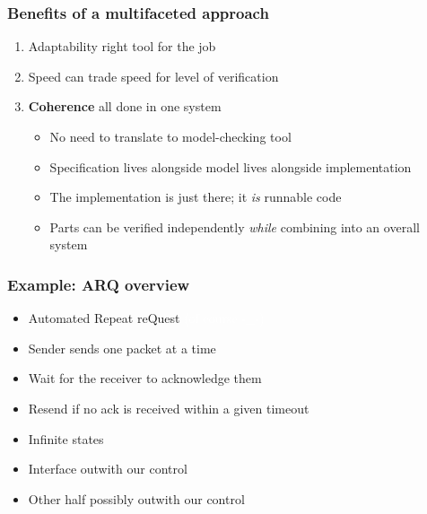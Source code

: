 \documentclass[compress]{beamer}
\begin{document}
\begin{frame}
  \frametitle{Benefits of a multifaceted approach}

  \begin{enumerate}
    \item Adaptability {\textemdash} right tool for the job
    \item Speed {\textemdash} can trade speed for level of verification
    \item \textbf{Coherence} {\textemdash} all done in one system
      \begin{itemize}
        \item No need to translate to model-checking tool
        \item Specification lives alongside model lives alongside
              implementation
        \item The implementation is just there; it \emph{is} runnable code
        \item Parts can be verified independently \emph{while} combining into an
              overall system
      \end{itemize}
  \end{enumerate}

\end{frame}

\begin{frame}
  \frametitle{Example: ARQ {\textendash} overview}


  \begin{itemize}
    \item Automated Repeat reQuest {\textcolor{white}{(of course -\_-)}}
    \item Sender sends one packet at a time
    \item Wait for the receiver to acknowledge them
    \item Resend if no ack is received within a given timeout
  \end{itemize}

  \begin{itemize}
    \item Infinite states
    \item Interface outwith our control
    \item Other half possibly outwith our control
  \end{itemize}

\end{frame}
\end{document}
